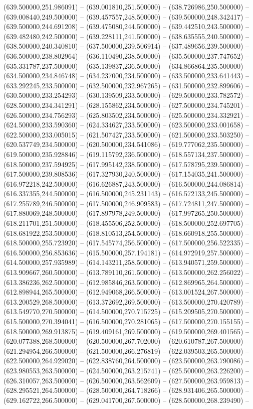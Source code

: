    (639.500000,251.986091) -- (639.001810,251.500000) -- (638.726986,250.500000) -- (639.008440,249.500000) -- (639.457557,248.500000) -- (639.500000,248.342417) -- (639.500000,244.691208) -- (639.475080,244.500000) -- (639.442510,243.500000) -- (639.482480,242.500000) -- (639.228111,241.500000) -- (638.635555,240.500000) -- (638.500000,240.340810) -- (637.500000,239.506914) -- (637.489656,239.500000) -- (636.500000,238.802964) -- (636.110490,238.500000) -- (635.500000,237.747652) -- (635.331787,237.500000) -- (635.139837,236.500000) -- (634.866864,235.500000) -- (634.500000,234.846748) -- (634.237000,234.500000) -- (633.500000,233.641443) -- (633.292245,233.500000) -- (632.500000,232.967265) -- (631.500000,232.899606) -- (630.500000,233.254293) -- (630.139509,233.500000) -- (629.500000,233.782572) -- (628.500000,234.341291) -- (628.155862,234.500000) -- (627.500000,234.745201) -- (626.500000,234.756293) -- (625.803502,234.500000) -- (625.500000,234.332921) -- (624.500000,233.590360) -- (624.334627,233.500000) -- (623.500000,233.001658) -- (622.500000,233.005015) -- (621.507427,233.500000) -- (621.500000,233.503250) -- (620.537749,234.500000) -- (620.500000,234.541086) -- (619.777062,235.500000) -- (619.500000,235.928846) -- (619.115792,236.500000) -- (618.557134,237.500000) -- (618.500000,237.594925) -- (617.995142,238.500000) -- (617.578795,239.500000) -- (617.500000,239.808536) -- (617.327930,240.500000) -- (617.154035,241.500000) -- (616.972218,242.500000) -- (616.626887,243.500000) -- (616.500000,244.086814) -- (616.337355,244.500000) -- (616.500000,245.231143) -- (616.572133,245.500000) -- (617.255789,246.500000) -- (617.500000,246.909583) -- (617.724811,247.500000) -- (617.880069,248.500000) -- (617.897978,249.500000) -- (617.997265,250.500000) -- (618.211701,251.500000) -- (618.455506,252.500000) -- (618.500000,252.697705) -- (618.681922,253.500000) -- (618.810513,254.500000) -- (618.660918,255.500000) -- (618.500000,255.723920) -- (617.545774,256.500000) -- (617.500000,256.522335) -- (616.500000,256.853636) -- (615.500000,257.194181) -- (614.972919,257.500000) -- (614.500000,257.935989) -- (614.143211,258.500000) -- (613.940571,259.500000) -- (613.909667,260.500000) -- (613.789110,261.500000) -- (613.500000,262.256022) -- (613.386236,262.500000) -- (612.985846,263.500000) -- (612.869965,264.500000) -- (612.898944,265.500000) -- (612.949068,266.500000) -- (613.001524,267.500000) -- (613.200529,268.500000) -- (613.372692,269.500000) -- (613.500000,270.420789) -- (613.549770,270.500000) -- (614.500000,270.715725) -- (615.209505,270.500000) -- (615.500000,270.394041) -- (616.500000,270.281065) -- (617.500000,270.155155) -- (618.500000,269.913875) -- (619.409161,269.500000) -- (619.500000,269.401565) -- (620.077388,268.500000) -- (620.500000,267.702000) -- (620.610787,267.500000) -- (621.294954,266.500000) -- (621.500000,266.276819) -- (622.039503,265.500000) -- (622.500000,264.929020) -- (622.838760,264.500000) -- (623.500000,263.790086) -- (623.980553,263.500000) -- (624.500000,263.215741) -- (625.500000,263.226200) -- (626.310057,263.500000) -- (626.500000,263.562609) -- (627.500000,263.959813) -- (628.295521,264.500000) -- (628.500000,264.718266) -- (628.931406,265.500000) -- (629.162722,266.500000) -- (629.041700,267.500000) -- (628.500000,268.239490) -- 